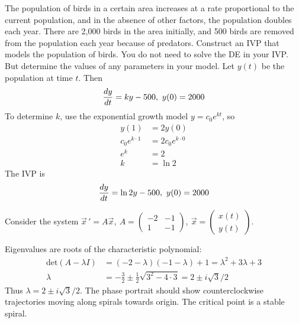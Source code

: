 \question[2]{} The population of birds in a certain area increases at a rate proportional to the current population, and in the absence of other factors, the population doubles each year. There are 2,000 birds in the area initially, and 500 birds are removed from the population each year because of predators. Construct an IVP that models the population of birds. You do not need to solve the DE in your IVP. But determine the values of any parameters in your model. 
\ifnum {} {\color{DarkBlue} 
Let $y(t)$ be the population at time $t$. Then 
$${\frac{dy}{dt}} = ky - 500, \ y(0) = 2000$$
To determine $k$, use the exponential growth model $y = c_0e^{kt}$, so 
\begin{align}
    y(1) & = 2y(0) \\
    c_0e^{k\cdot1} &= 2c_0e^{k\cdot0} \\
    e^{k} &= 2 \\
    k &= \ln 2
\end{align}
The IVP is 
$${\frac{dy}{dt}} = \ln2 y - 500, \ y(0) = 2000$$
} 
\else 
\fi
\fi



\ifnum {}
\setlength{\extrarowheight}{0.0cm}
\question[3] Consider the system $\displaystyle \vec x \, ' = A\vec x, \ A = \begin{pmatrix} -2&-1\\1&-1 \end{pmatrix}, \ \vec x = \begin{pmatrix} x(t)\\y(t)\end{pmatrix} $.
\ifnum {} {\color{DarkBlue} 
Eigenvalues are roots of the characteristic polynomial:
\begin{align}
    \text{det}\left(A - \lambda I\right) &= (-2-\lambda)(-1 - \lambda) + 1 =\lambda^2 + 3\lambda + 3 \\
    \lambda &= -\frac{3}{2} \pm \frac12 \sqrt{3^2 - 4\cdot3} = 2 \pm i \sqrt3/2
\end{align}
Thus $\lambda =  2\pm i\sqrt3/2$. The phase portrait should show counterclockwise trajectories moving along spirals towards origin. The critical point is a stable spiral.  

} 
\else 
\vspace{1cm}
\fi

